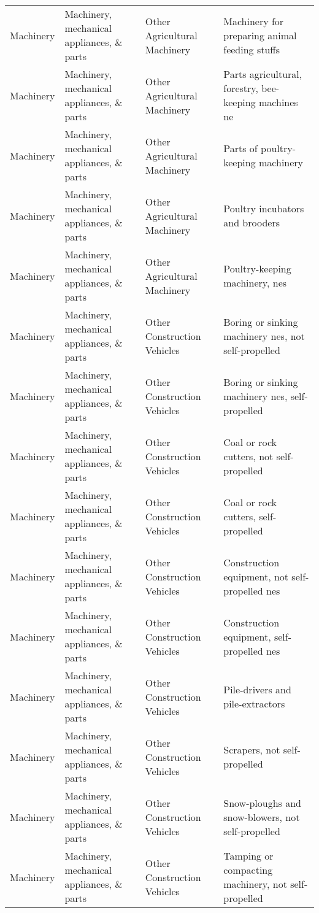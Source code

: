 \begin{appendices}
\begin{xltabular}{\textwidth}{|p{0.07\textwidth}|p{0.25\textwidth}|p{0.28\textwidth}|p{0.3\textwidth}|}
		Machinery & Machinery, mechanical appliances, \& parts & Other Agricultural Machinery & Machinery for preparing animal feeding stuffs \\
		Machinery & Machinery, mechanical appliances, \& parts & Other Agricultural Machinery & Parts agricultural, forestry, bee-keeping machines ne \\
		Machinery & Machinery, mechanical appliances, \& parts & Other Agricultural Machinery & Parts of poultry-keeping machinery \\
		Machinery & Machinery, mechanical appliances, \& parts & Other Agricultural Machinery & Poultry incubators and brooders \\
		Machinery & Machinery, mechanical appliances, \& parts & Other Agricultural Machinery & Poultry-keeping machinery, nes \\
		Machinery & Machinery, mechanical appliances, \& parts & Other Construction Vehicles & Boring or sinking machinery nes, not self-propelled \\
		Machinery & Machinery, mechanical appliances, \& parts & Other Construction Vehicles & Boring or sinking machinery nes, self-propelled \\
		Machinery & Machinery, mechanical appliances, \& parts & Other Construction Vehicles & Coal or rock cutters, not self-propelled \\
		Machinery & Machinery, mechanical appliances, \& parts & Other Construction Vehicles & Coal or rock cutters, self-propelled \\
		Machinery & Machinery, mechanical appliances, \& parts & Other Construction Vehicles & Construction equipment, not self-propelled nes \\
		Machinery & Machinery, mechanical appliances, \& parts & Other Construction Vehicles & Construction equipment, self-propelled nes \\
		Machinery & Machinery, mechanical appliances, \& parts & Other Construction Vehicles & Pile-drivers and pile-extractors \\
		Machinery & Machinery, mechanical appliances, \& parts & Other Construction Vehicles & Scrapers, not self-propelled \\
		Machinery & Machinery, mechanical appliances, \& parts & Other Construction Vehicles & Snow-ploughs and snow-blowers, not self-propelled \\
		Machinery & Machinery, mechanical appliances, \& parts & Other Construction Vehicles & Tamping or compacting machinery, not self-propelled \\

\end{xltabular}
\end{appendices}
